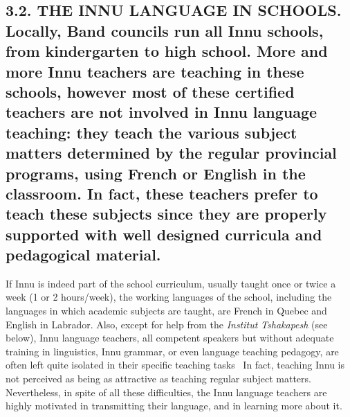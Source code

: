 \documentclass[letterpaper]{article}
\begin{document}
\subsection[3.2. THE INNU LANGUAGE IN SCHOOLS. Locally, Band councils run all Innu schools, from kindergarten to high school. More and more Innu teachers are teaching in these schools, however most of these certified teachers are not involved in Innu language teaching: they teach the various subject matters determined by the regular provincial programs, using French or English in the classroom. In fact, these teachers prefer to teach these subjects since they are properly supported with well designed curricula and pedagogical material.]{3.2. THE INNU LANGUAGE IN SCHOOLS. \textmd{Locally}\textmd{,}\textmd{ }\textmd{Band councils run all Innu schools}\textmd{, }\textmd{from }\textmd{kindergarten}\textmd{ }\textmd{to }\textmd{high school}\textmd{. }\textmd{M}\textmd{ore and more Innu teachers }\textmd{are teaching }\textmd{in these schools}\textmd{, however }\textmd{most of these}\textmd{ certified}\textmd{ teachers are not }\textmd{involved}\textmd{ in}\textmd{ Innu language teaching: they teach}\textmd{ the various subject matters determined by the }\textmd{regular }\textmd{provincial programs}\textmd{,}\textmd{ using French or English }\textmd{in }\textmd{the }\textmd{classroom}\textmd{.}\textmd{ }\textmd{In fact, these teachers }\textmd{prefer}\textmd{ }\textmd{to teach }\textmd{these }\textmd{subjects}\textmd{ }\textmd{since they }\textmd{are }\textmd{properly}\textmd{ supported }\textmd{with}\textmd{ }\textmd{well designed }\textmd{curricula and }\textmd{pedagogical material.}}
If Innu is indeed part of the school curriculum, usually taught once or twice a week (1 or 2 hours/week), the working languages of the school, including the languages in which academic subjects are taught, are French in Quebec and English in Labrador. Also, except for help from the \textit{Institut }\textit{Tshakapesh} (see below), Innu language teachers, all competent speakers but without adequate training in linguistics, Innu grammar, or even language teaching pedagogy, are often left quite isolated in their specific teaching tasks ~In fact, teaching Innu is not perceived as being as attractive as teaching regular subject matters. Nevertheless, in spite of all these difficulties, the Innu language teachers are highly motivated in transmitting their language, and in learning more about it.
\end{document}
